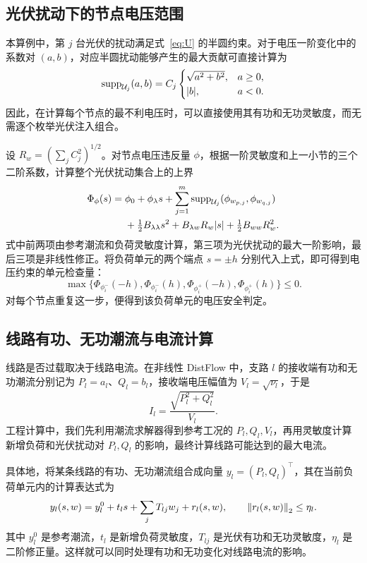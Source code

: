 \subsection{光伏扰动下的节点电压范围}

本算例中，第 $j$ 台光伏的扰动满足式~\eqref{eq:U} 的半圆约束。对于电压一阶变化中的系数对 $(a,b)$，对应半圆扰动能够产生的最大贡献可直接计算为
\begin{equation}
\operatorname{supp}_{\mathcal U_j}(a,b)=
C_j\begin{cases}
\sqrt{a^2+b^2},&a\ge0,\\
|b|,&a<0.
\end{cases}
\label{eq:support}
\end{equation}
因此，在计算每个节点的最不利电压时，可以直接使用其有功和无功灵敏度，而无需逐个枚举光伏注入组合。

设 $R_w=(\sum_jC_j^2)^{1/2}$。对节点电压违反量 $\phi$，根据一阶灵敏度和上一小节的三个二阶系数，计算整个光伏扰动集合上的上界
\begin{align}
\Phi_\phi(s)={}&
\phi_0+\phi_\lambda s+
\sum_{j=1}^{m}
\operatorname{supp}_{\mathcal U_j}(\phi_{w_{p,j}},\phi_{w_{q,j}})
\nonumber\\
&+\tfrac12B_{\lambda\lambda}s^2+
B_{\lambda w}R_w|s|+
\tfrac12B_{ww}R_w^2.
\label{eq:Vbound}
\end{align}
式中前两项由参考潮流和负荷灵敏度计算，第三项为光伏扰动的最大一阶影响，最后三项是非线性修正。将负荷单元的两个端点 $s=\pm h$ 分别代入上式，即可得到电压约束的单元检查量：
\begin{equation}
\max\{\Phi_{\phi_i^-}(-h),\Phi_{\phi_i^-}(h),
\Phi_{\phi_i^+}(-h),\Phi_{\phi_i^+}(h)\}\le0.
\label{eq:voltage_accept}
\end{equation}
对每个节点重复这一步，便得到该负荷单元的电压安全判定。

\subsection{线路有功、无功潮流与电流计算}

线路是否过载取决于线路电流。在非线性 DistFlow 中，支路 $l$ 的接收端有功和无功潮流分别记为 $P_l=a_l$、$Q_l=b_l$，接收端电压幅值为 $V_l=\sqrt{\nu_l}$，于是
\begin{equation}
I_l=\frac{\sqrt{P_l^2+Q_l^2}}{V_l}.
\label{eq:current_physical}
\end{equation}
工程计算中，我们先利用潮流求解器得到参考工况的 $P_l,Q_l,V_l$，再用灵敏度计算新增负荷和光伏扰动对 $P_l,Q_l$ 的影响，最终计算线路可能达到的最大电流。

具体地，将某条线路的有功、无功潮流组合成向量 $y_l=(P_l,Q_l)^\top$，其在当前负荷单元内的计算表达式为
\begin{equation}
y_l(s,w)=y_l^0+t_ls+\sum_jT_{lj}w_j+r_l(s,w),
\qquad \left\lVert r_l(s,w)\right\rVert_2\le\eta_l .
\label{eq:affine}
\end{equation}
其中 $y_l^0$ 是参考潮流，$t_l$ 是新增负荷灵敏度，$T_{lj}$ 是光伏有功和无功灵敏度，$\eta_l$ 是二阶修正量。这样就可以同时处理有功和无功变化对线路电流的影响。

